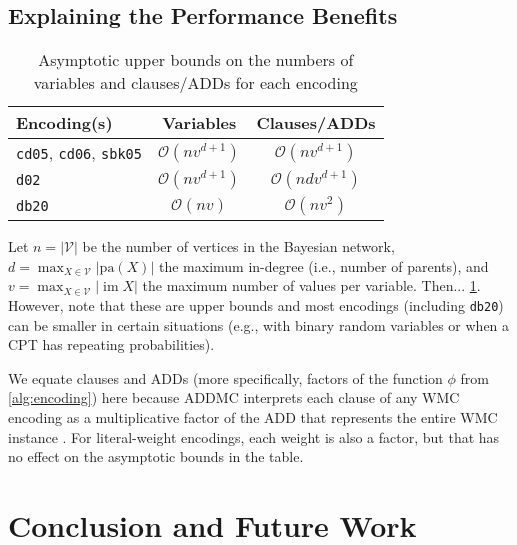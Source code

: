 \documentclass{article}
\theoremstyle{definition}
\theoremstyle{remark}
\DeclareMathOperator{\im}{im}
\begin{document}
{\subsection{Explaining the Performance Benefits}


\begin{table}
  \centering
  \caption{Asymptotic upper bounds on the numbers of variables and clauses/ADDs
    for each encoding}
  \label{tbl:asymptotes}
  \begin{tabular}{lcc}
    \toprule
    Encoding(s) & Variables & Clauses/ADDs \\
    \midrule
    \texttt{cd05}, \texttt{cd06}, \texttt{sbk05} & $\mathcal{O}(nv^{d+1})$ & $\mathcal{O}(nv^{d+1})$ \\
    \texttt{d02} & $\mathcal{O}(nv^{d+1})$ & $\mathcal{O}(ndv^{d+1})$ \\
    \texttt{db20} & $\mathcal{O}(nv)$ & $\mathcal{O}(nv^2)$ \\
    \bottomrule
  \end{tabular}
\end{table}

Let $n = |\mathcal{V}|$ be the number of vertices in the Bayesian network, $d =
\max_{X \in \mathcal{V}} |\mathrm{pa}(X)|$ the maximum in-degree (i.e., number
of parents), and $v = \max_{X \in \mathcal{V}} |\im X|$ the maximum number of
values per variable. Then... \cref{tbl:asymptotes}. However, note that these are
upper bounds and most encodings (including \texttt{db20}) can be smaller in
certain situations (e.g., with binary random variables or when a CPT has
repeating probabilities).

We equate clauses and ADDs (more specifically, factors of the function $\phi$
from \cref{alg:encoding}) here because ADDMC interprets each clause of any WMC
encoding as a multiplicative factor of the ADD that represents the entire WMC
instance \cite{DBLP:conf/aaai/DudekPV20}. For literal-weight encodings, each
weight is also a factor, but that has no effect on the asymptotic bounds in the
table.

\section{Conclusion and Future Work}

}
\end{document}
